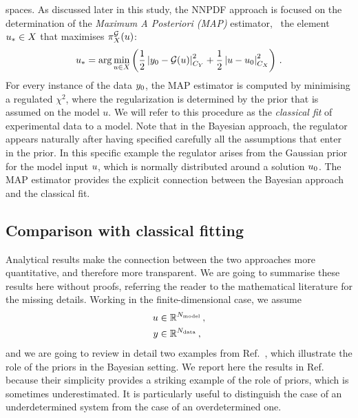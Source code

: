 spaces. As discussed later in this study, the NNPDF approach is focused on the
determination of the {\em Maximum A Posteriori (MAP)} estimator, \ie\ the
element $u_* \in X$ that maximises $\pi_{X}^{\mathcal{G}}(u)$:
\begin{align}
  \label{eq:MAP}
  u_* = \arg\min_{u \in X} 
  \left(
    \frac12 \left| y_0 - \mathcal{G}(u) \right|_{C_{Y}}^2
    + \frac12 \left| u - u_0 \right|_{C_X}^2
  \right)\, .
\end{align}
For every instance of the data $y_0$, the MAP estimator is computed by
minimising a regulated $\chi^2$, where the regularization is determined by the
prior that is assumed on the model $u$. We will refer to this procedure as the
{\em classical fit} of experimental data to a model. Note that in the Bayesian
approach, the regulator appears naturally after having specified carefully all
the assumptions that enter in the prior. In this specific example the regulator
arises from the Gaussian prior for the model input $u$, which is
normally distributed around a solution $u_0$. The MAP estimator
provides the explicit connection between the Bayesian approach and the classical
fit.

\subsection{Comparison with classical fitting}
\label{sec:comp-class-fit}

Analytical results make the connection between the two approaches more
quantitative, and therefore more transparent. We are going to summarise these
results here without proofs, referring the reader to the mathematical literature
for the missing details. Working in the finite-dimensional case, we assume 
\begin{align*}
  u &\in \mathbb{R}^{N_{\rm model}} \, ,\\
  y &\in \mathbb{R}^{N_{\rm data}}\, ,
\end{align*}
and we are going to review in detail two examples from Ref.~\cite{Stuart:2010},
which illustrate the role of the priors in the Bayesian setting. We report here
the results in Ref.~\cite{Stuart:2010} because their simplicity provides a
striking example of the role of priors, which is sometimes underestimated. It is
particularly useful to distinguish the case of an underdetermined system from
the case of an overdetermined one. 

